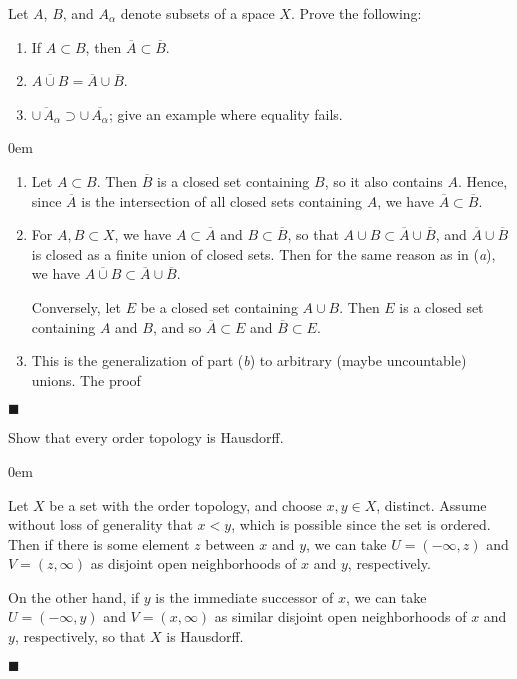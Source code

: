 \documentclass[12pt]{article}
\renewcommand{\qed}{\hfill$\blacksquare$}
\renewenvironment{proof}{\begin{addmargin}[1em]{0em}\begin{newproof}}{\end{newproof}\end{addmargin}\qed}
\newenvironment{problem}[2][Exercise]{\begin{trivlist}
\item[\hskip \labelsep {\bfseries #1}\hskip \labelsep {\bfseries #2.}]}{\end{trivlist}}
\begin{document}
\begin{problem}{17.6}
Let $A$, $B$, and $A_{\alpha}$ denote subsets of a space $X$. Prove the following:
\begin{enumerate}[label=(\alph*)]
	\item If $A\subset B$, then $\overline{A} \subset \overline{B}$.
	\item $\overline{A\cup B} = \overline{A}\cup \overline{B}$.
	\item $ \overline{\cup \,A_{\alpha}} \supset \cup\, \overline{A_{\alpha}}$; give an example where equality fails.
\end{enumerate}
\end{problem}
\begin{proof}
\begin{enumerate}[label=(\alph*)]
	\item Let $A\subset B$. Then $\overline{B}$ is a closed set containing $B$, so it also contains $A$. Hence, since $\overline{A}$ is the intersection of all closed sets containing $A$, we have $\overline{A} \subset \overline{B}$.
	\item For $A,B\subset X$, we have $A\subset \overline{A}$ and $B\subset \overline{B}$, so that $A\cup B \subset \overline{A}\cup \overline{B}$, and $\overline{A}\cup\overline{B}$ is closed as a finite union of closed sets. Then for the same reason as in (\textit{a}), we have $\overline{A\cup B} \subset \overline{A}\cup\overline{B}$.
	
	Conversely, let $E$ be a closed set containing $A\cup B$. Then $E$ is a closed set containing $A$ and $B$, and so $\overline{A} \subset E$ and $\overline{B}\subset E$. 	
	\item This is the generalization of part (\textit{b}) to arbitrary (maybe uncountable) unions. The proof 
\end{enumerate}
\end{proof}




\begin{problem}{17.10}
Show that every order topology is Hausdorff.
\end{problem}
\begin{proof}
Let $X$ be a set with the order topology, and choose $x,y \in X$, distinct. Assume without loss of generality that $x < y$, which is possible since the set is ordered. Then if there is some element $z$ between $x$ and $y$, we can take $U=\left(-\infty,z\right)$ and $V=\left(z,\infty\right)$ as disjoint open neighborhoods of $x$ and $y$, respectively.

On the other hand, if $y$ is the immediate successor of $x$, we can take $U=\left(-\infty,y\right)$ and $V=\left(x,\infty\right)$ as similar disjoint open neighborhoods of $x$ and $y$, respectively, so that $X$ is Hausdorff.
\end{proof}
\end{document}
